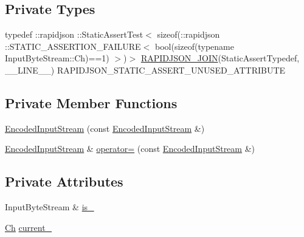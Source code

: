 \subsection*{Private Types}
\begin{DoxyCompactItemize}
\item 
typedef \+::rapidjson \+::Static\+Assert\+Test$<$ sizeof(\+::rapidjson \+::S\+T\+A\+T\+I\+C\+\_\+\+A\+S\+S\+E\+R\+T\+I\+O\+N\+\_\+\+F\+A\+I\+L\+U\+RE$<$ bool(sizeof(typename Input\+Byte\+Stream\+::\+Ch)==1) $>$)$>$ \mbox{\hyperlink{classrapidjson_1_1_encoded_input_stream_ab4fd5f290d8fa9dc1922fac07dc90672}{R\+A\+P\+I\+D\+J\+S\+O\+N\+\_\+\+J\+O\+IN}}(Static\+Assert\+Typedef, \+\_\+\+\_\+\+L\+I\+N\+E\+\_\+\+\_\+) R\+A\+P\+I\+D\+J\+S\+O\+N\+\_\+\+S\+T\+A\+T\+I\+C\+\_\+\+A\+S\+S\+E\+R\+T\+\_\+\+U\+N\+U\+S\+E\+D\+\_\+\+A\+T\+T\+R\+I\+B\+U\+TE
\end{DoxyCompactItemize}
\subsection*{Private Member Functions}
\begin{DoxyCompactItemize}
\item 
\mbox{\hyperlink{classrapidjson_1_1_encoded_input_stream_a46f53117d821a6fc14034d7d682ef751}{Encoded\+Input\+Stream}} (const \mbox{\hyperlink{classrapidjson_1_1_encoded_input_stream}{Encoded\+Input\+Stream}} \&)
\item 
\mbox{\hyperlink{classrapidjson_1_1_encoded_input_stream}{Encoded\+Input\+Stream}} \& \mbox{\hyperlink{classrapidjson_1_1_encoded_input_stream_a5f67ffabb8a832326b73aca45684e073}{operator=}} (const \mbox{\hyperlink{classrapidjson_1_1_encoded_input_stream}{Encoded\+Input\+Stream}} \&)
\end{DoxyCompactItemize}
\subsection*{Private Attributes}
\begin{DoxyCompactItemize}
\item 
Input\+Byte\+Stream \& \mbox{\hyperlink{classrapidjson_1_1_encoded_input_stream_a5c79d4b5cf1dd31b723f65ba9923955c}{is\+\_\+}}
\item 
\mbox{\hyperlink{classrapidjson_1_1_encoded_input_stream_ac1cf99de822b615beaa5e33ac989a20a}{Ch}} \mbox{\hyperlink{classrapidjson_1_1_encoded_input_stream_a87c63969234cad5b4a9a594f4add3a2a}{current\+\_\+}}
\end{DoxyCompactItemize}


